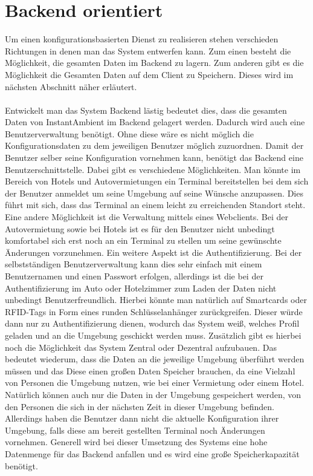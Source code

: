 \section{Backend orientiert}
Um einen konfigurationsbasierten Dienst zu realisieren stehen verschieden Richtungen in denen man das System entwerfen kann. 
Zum einen besteht die Möglichkeit, die gesamten Daten im Backend zu lagern. Zum anderen gibt es die Möglichkeit die Gesamten Daten auf dem Client zu Speichern. Dieses wird im nächsten Abschnitt näher erläutert.
\\\\
Entwickelt man das System Backend lästig bedeutet dies, dass die gesamten Daten von InstantAmbient im Backend gelagert werden. 
Dadurch wird auch eine Benutzerverwaltung benötigt. Ohne diese wäre es nicht möglich die Konfigurationsdaten zu dem jeweiligen Benutzer möglich zuzuordnen. Damit der Benutzer selber seine Konfiguration vornehmen kann, benötigt das Backend eine Benutzerschnittstelle. Dabei gibt es verschiedene Möglichkeiten. Man könnte im Bereich von Hotels und Autovermietungen ein Terminal bereitstellen bei dem sich der Benutzer anmeldet um seine Umgebung auf seine Wünsche anzupassen. Dies führt mit sich, dass das Terminal an einem leicht zu erreichenden Standort steht. Eine andere Möglichkeit ist die Verwaltung mittels eines Webclients. Bei der Autovermietung sowie bei Hotels ist es für den Benutzer nicht unbedingt komfortabel sich erst noch an ein Terminal zu stellen um seine gewünschte Änderungen vorzunehmen. 
Ein weitere Aspekt ist die Authentifizierung. Bei der selbstständigen Benutzerverwaltung kann dies sehr einfach mit einem Benutzernamen und einen Passwort erfolgen, allerdings ist die bei der Authentifizierung im Auto oder Hotelzimmer zum Laden der Daten nicht unbedingt Benutzerfreundlich. Hierbei könnte man natürlich auf Smartcards oder RFID-Tags in Form eines runden Schlüsselanhänger zurückgreifen. Dieser würde dann nur zu Authentifizierung dienen, wodurch das System weiß, welches Profil geladen und an die Umgebung geschickt werden muss. Zusätzlich gibt es hierbei noch die Möglichkeit das System Zentral oder Dezentral aufzubauen. Das bedeutet wiederum, dass die Daten an die jeweilige Umgebung überführt werden müssen und das Diese einen großen Daten Speicher brauchen, da eine Vielzahl von Personen die Umgebung nutzen, wie bei einer Vermietung oder einem Hotel. Natürlich können auch nur die Daten in der Umgebung gespeichert werden, von den Personen die sich in der nächsten Zeit in dieser Umgebung befinden. Allerdings haben die Benutzer dann nicht die aktuelle Konfiguration ihrer Umgebung, falls diese am bereit gestellten Terminal noch Änderungen vornehmen.  
Generell wird bei dieser Umsetzung des Systems eine hohe Datenmenge für das Backend anfallen und es wird eine große Speicherkapazität benötigt.

